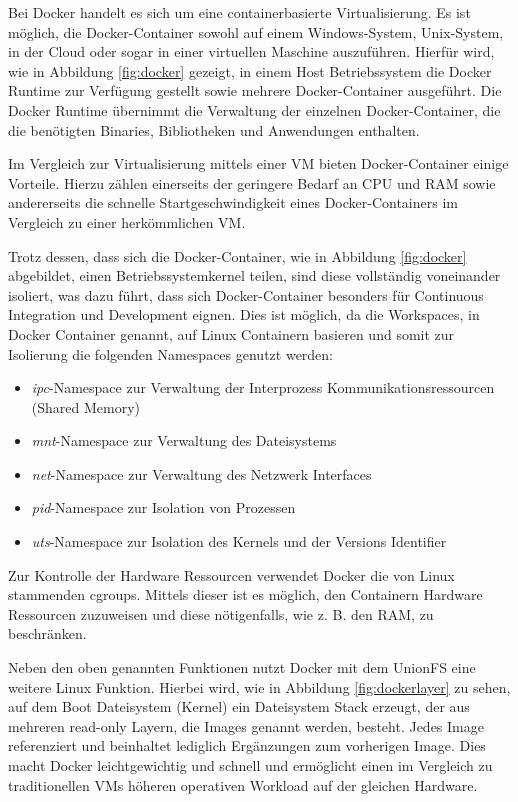 Bei Docker handelt es sich um eine containerbasierte Virtualisierung.
Es ist möglich, die Docker-Container sowohl auf einem Windows-System, Unix-System, in der Cloud oder sogar in einer virtuellen Maschine auszuführen.
Hierfür wird, wie in Abbildung \ref{fig:docker} gezeigt, in einem Host Betriebssystem die Docker Runtime zur Verfügung gestellt sowie mehrere Docker-Container ausgeführt.
Die Docker Runtime übernimmt die Verwaltung der einzelnen Docker-Container, die die benötigten Binaries, Bibliotheken und Anwendungen enthalten.

Im Vergleich zur Virtualisierung mittels einer \ac{VM} bieten Docker-Container einige Vorteile.
Hierzu zählen einerseits der geringere Bedarf an CPU und RAM sowie andererseits die schnelle Startgeschwindigkeit eines Docker-Containers im Vergleich zu einer herkömmlichen \ac{VM}.

Trotz dessen, dass sich die Docker-Container, wie in Abbildung \ref{fig:docker} abgebildet, einen Betriebssystemkernel teilen, sind diese vollständig voneinander isoliert, was dazu führt, dass sich Docker-Container besonders für Continuous Integration und Development eignen.
Dies ist möglich, da die Workspaces, in Docker \glqq{}Container\grqq{} genannt, auf Linux Containern basieren und somit zur Isolierung die folgenden Namespaces genutzt werden:

\begin{itemize}
	\item \textit{ipc}-Namespace zur Verwaltung der Interprozess Kommunikationsressourcen (Shared Memory)
	\item \textit{mnt}-Namespace zur Verwaltung des Dateisystems
	\item \textit{net}-Namespace zur Verwaltung des Netzwerk Interfaces
	\item \textit{pid}-Namespace zur Isolation von Prozessen
	\item \textit{uts}-Namespace zur Isolation des Kernels und der Versions Identifier
\end{itemize}

Zur Kontrolle der Hardware Ressourcen verwendet Docker die von Linux stammenden \ac{cgroups}.
Mittels dieser ist es möglich, den Containern Hardware Ressourcen zuzuweisen und diese nötigenfalls, wie z. B. den RAM, zu beschränken.

Neben den oben genannten Funktionen nutzt Docker mit dem \ac{UnionFS} eine weitere Linux Funktion.
Hierbei wird, wie in Abbildung \ref{fig:dockerlayer} zu sehen, auf dem Boot Dateisystem (Kernel) ein Dateisystem Stack erzeugt, der aus mehreren read-only Layern, die Images genannt werden, besteht.
Jedes Image referenziert und beinhaltet lediglich Ergänzungen zum vorherigen Image.
Dies macht Docker leichtgewichtig und schnell und ermöglicht einen im Vergleich zu traditionellen \acp{VM} höheren operativen Workload auf der gleichen Hardware.

